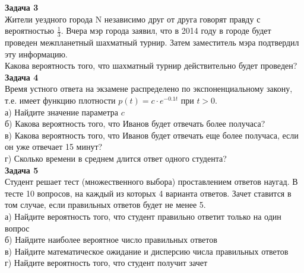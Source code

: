 \documentclass[pdftex,12pt,a4paper]{article}
\begin{document}
\textbf{Задача 3} \\ %
Жители уездного города N независимо друг от друга говорят правду с вероятностью $\frac{1}{3}$. Вчера мэр города заявил, что в 2014 году в городе будет проведен межпланетный шахматный турнир. Затем заместитель мэра подтвердил эту информацию. \\
Какова вероятность того, что шахматный турнир действительно будет проведен? \\

\textbf{Задача 4} \\ %
Время устного ответа на экзамене распределено по экспоненциальному закону, т.е. имеет функцию плотности $p(t)=c\cdot e^{-0.1t}$ при $t>0$. \\
а) Найдите значение параметра $c$ \\
б) Какова вероятность того, что Иванов будет отвечать более получаса? \\
в) Какова вероятность того, что Иванов будет отвечать еще более получаса, если он уже отвечает 15 минут? \\
г) Сколько времени в среднем длится ответ одного студента? \\






\textbf{Задача 5} \\ %
Студент решает тест (множественного выбора) проставлением
ответов наугад. В тесте 10 вопросов, на каждый из которых 4
варианта ответов. Зачет ставится в том случае, если правильных
ответов будет не менее 5. \\
а) Найдите вероятность того, что студент правильно ответит только
на один вопрос \\
б) Найдите наиболее вероятное число правильных ответов \\
в) Найдите математическое ожидание и дисперсию числа правильных
ответов \\
г) Найдите вероятность того, что студент получит зачет \\
\end{document}
